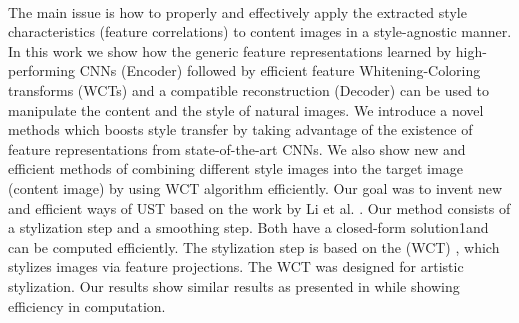 \\
The main issue is how to properly and effectively apply the extracted style characteristics (feature correlations) to content images in a style-agnostic manner.\newline
\\
In this work we show how the generic feature representations learned by high-performing CNNs (Encoder) followed by efficient feature Whitening-Coloring transforms (WCTs) and a compatible reconstruction (Decoder) can be used to manipulate the content and the style of natural images.
We introduce a novel methods which boosts style transfer by taking advantage of the existence of feature representations from state-of-the-art CNNs.  
We also show new and efficient methods of combining different style images into the target image (content image) by using WCT algorithm efficiently.
Our goal was to invent new and efficient ways of UST based on the work by Li et al. \cite{bib11}.
Our method consists of a stylization step and a smoothing step. Both have a closed-form solution1and can be computed efficiently. The stylization step is based on the (WCT) \cite{bib10}, which stylizes images via feature projections. The WCT was designed for artistic stylization.
Our results show similar results as presented in \cite{bib10} while showing efficiency in computation.